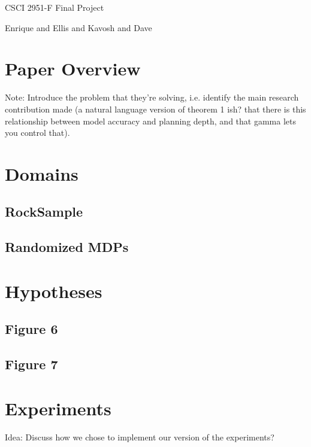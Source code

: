 \documentclass[11pt]{article} %
\begin{document}
\centerline{\LARGE{CSCI 2951-F Final Project}}
\centerline{Enrique and Ellis and Kavosh and Dave}
\vspace{2mm}


\section{Paper Overview}

Note: Introduce the problem that they're solving, i.e. identify the main research contribution made (a natural language version of theorem 1 ish? that there is this relationship between model accuracy and planning depth, and that gamma lets you control that).


\section{Domains}

\subsection{RockSample}

\subsection{Randomized MDPs}



\section{Hypotheses}

\subsection{Figure 6}

\subsection{Figure 7}


\section{Experiments}

Idea: Discuss how we chose to implement our version of the experiments?
\end{document}
